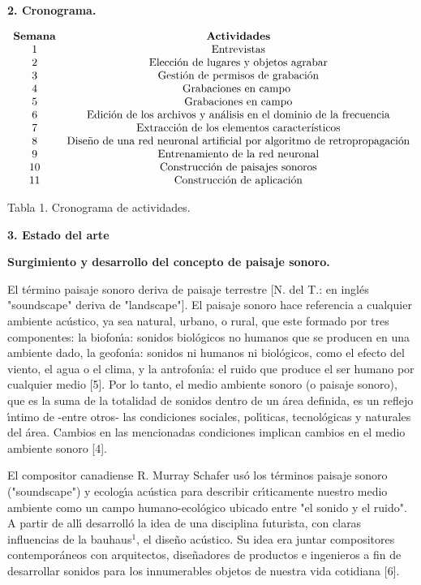 \textbf{2. Cronograma.}

$%
\begin{array}
[c]{cc}%
\text{\textbf{Semana}} & \text{\textbf{Actividades}}\\
\text{1} & \text{Entrevistas}\\
\text{2} & \text{Elecci\'{o}n de lugares y objetos agrabar}\\
\text{3} & \text{Gesti\'{o}n de permisos de grabaci\'{o}n}\\
\text{4} & \text{Grabaciones en campo }\\
\text{5} & \text{Grabaciones en campo}\\
\text{6} & \text{Edici\'{o}n de los archivos y an\'{a}lisis en el dominio de
la frecuencia}\\
\text{7} & \text{Extracci\'{o}n de los elementos caracter\'{\i}sticos}\\
\text{8} & \text{Dise\~{n}o de una red neuronal artificial por algoritmo de
retropropagaci\'{o}n}\\
\text{9} & \text{Entrenamiento de la red neuronal}\\
\text{10} & \text{Construcci\'{o}n de paisajes sonoros}\\
\text{11} & \text{Construcci\'{o}n de aplicaci\'{o}n}%
\end{array}
$

Tabla 1. Cronograma de actividades.

\textbf{3. Estado del arte}

\textbf{ Surgimiento y desarrollo del concepto de paisaje sonoro.}

El t\'{e}rmino paisaje sonoro deriva de paisaje terrestre [N. del T.: en
ingl\'{e}s "soundscape" deriva de "landscape"]. El paisaje sonoro hace
referencia a cualquier ambiente ac\'{u}stico, ya sea natural, urbano, o rural,
que este formado por tres componentes: la biofon\'{\i}a: sonidos
biol\'{o}gicos no humanos que se producen en una ambiente dado, la
geofon\'{\i}a: sonidos ni humanos ni biol\'{o}gicos, como el efecto del
viento, el agua o el clima, y la antrofon\'{\i}a: el ruido que produce el ser
humano por cualquier medio [5]. Por lo tanto, el medio ambiente sonoro (o
paisaje sonoro), que es la suma de la totalidad de sonidos dentro de un
\'{a}rea definida, es un reflejo \'{\i}ntimo de -entre otros- las condiciones
sociales, pol\'{\i}ticas, tecnol\'{o}gicas y naturales del \'{a}rea. Cambios
en las mencionadas condiciones implican cambios en el medio ambiente sonoro [4].

El compositor canadiense R. Murray Schafer us\'{o} los t\'{e}rminos paisaje
sonoro ("soundscape") y ecolog\'{\i}a ac\'{u}stica para describir
cr\'{\i}ticamente nuestro medio ambiente como un campo humano-ecol\'{o}gico
ubicado entre "el sonido y el ruido". A partir de all\'{\i} desarroll\'{o} la
idea de una disciplina futurista, con claras influencias de la bauhaus$^{1}$,
el dise\~{n}o ac\'{u}stico. Su idea era juntar compositores contempor\'{a}neos
con arquitectos, dise\~{n}adores de productos e ingenieros a fin de
desarrollar sonidos para los innumerables objetos de nuestra vida cotidiana [6].

